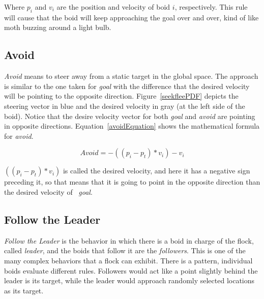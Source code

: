 Where $p_i$ and $v_i$ are the position and velocity of boid $i$, respectively. This rule will cause that the boid will keep approaching the goal over and over, kind of like moth buzzing around a light bulb.

\subsection{Avoid}
\textit{Avoid} means to steer away from a static target in the global space. The approach is similar to the one taken for \textit{goal} with the difference that the desired velocity will be pointing to the opposite direction. Figure~\ref{seekfleePDF} depicts the steering vector in blue and the desired velocity in gray (at the left side of the boid). Notice that the desire velocity vector for both \textit{goal} and \textit{avoid} are pointing in opposite directions. Equation~\ref{avoidEquation} shows the mathematical formula for \textit{avoid}.

\begin{equation}
\label{avoidEquation}
Avoid = -((p_i - p_t) * v_i) - v_i
\end{equation}

$((p_i - p_t) * v_i)$ is called the desired velocity, and here it has a negative sign preceding it, so that means that it is going to point in the opposite direction than the desired velocity of ~\textit{goal}.

\subsection{Follow the Leader}
\textit{Follow the Leader} is the behavior in which there is a boid in charge of the flock, called \textit{leader}, and the boids that follow it are the \textit{followers}. This is one of the many complex behaviors that a flock can exhibit. There is a pattern, individual boids evaluate different rules. Followers would act like a point slightly behind the leader is its target, while the leader would approach randomly selected locations as its target.

